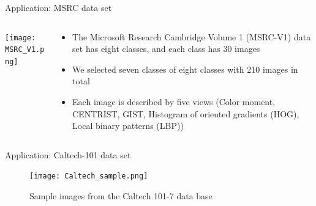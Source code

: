 \documentclass[compress,sky blue]{beamer}
\begin{document}
\begin{frame}{Application: MSRC data set }

\begin{columns}
  \begin{column}{0.3\textwidth}
    \begin{center}
     \texttt{[image: MSRC\_V1.png]}
     \end{center}
  \end{column}
  \begin{column}{0.7\textwidth}  %
    \begin{itemize}
	  \item The Microsoft Research Cambridge Volume 1 (MSRC-V1) data set has \alert{eight} classes, and each class has \alert{30} images \cite{Winn2005LOCUS:Segmentation}
	  \item We selected seven classes of eight classes with \alert{210} images in total
\item Each image is described by \alert{five} views (Color moment, CENTRIST, GIST, Histogram of oriented gradients (HOG), Local binary patterns (LBP))
	\end{itemize}
  \end{column}
\end{columns}

\end{frame}



\begin{frame}{Application: Caltech-101 data set }

\begin{figure}
\texttt{[image: Caltech\_sample.png]}
\caption{\label{fig:your-figure} Sample images from the Caltech 101-7 data base}
\end{figure}

\end{frame}
\end{document}
